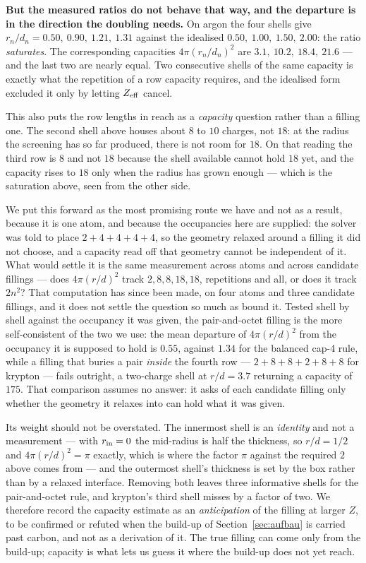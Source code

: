 \documentclass[11pt]{article}
\begin{document}
\textbf{But the measured ratios do not behave that way, and the departure is in the direction the
doubling needs.} On argon the four shells give $r_n/d_n = 0.50,\ 0.90,\ 1.21,\ 1.31$ against the
idealised $0.50,\ 1.00,\ 1.50,\ 2.00$: the ratio \emph{saturates}. The corresponding capacities
$4\pi(r_n/d_n)^2$ are $3.1,\ 10.2,\ 18.4,\ 21.6$ --- and the last two are nearly equal. Two
consecutive shells of the same capacity is exactly what the repetition of a row capacity requires,
and the idealised form excluded it only by letting $Z_{\rm eff}$ cancel.

This also puts the row lengths in reach as a \emph{capacity} question rather than a filling one. The
second shell above houses about $8$ to $10$ charges, not $18$: at the radius the screening has so far
produced, there is not room for $18$. On that reading the third row is $8$ and not $18$ because the
shell available cannot hold $18$ yet, and the capacity rises to $18$ only when the radius has grown
enough --- which is the saturation above, seen from the other side.

We put this forward as the most promising route we have and not as a result, because it is one atom,
and because the occupancies here are supplied: the solver was told to place $2{+}4{+}4{+}4{+}4$, so
the geometry relaxed around a filling it did not choose, and a capacity read off that geometry cannot
be independent of it. What would settle it is the same measurement across atoms and across candidate
fillings --- does $4\pi(r/d)^2$ track $2,8,8,18,18$, repetitions and all, or does it track $2n^2$?
That computation has since been made, on four atoms and three candidate fillings, and it does not
settle the question so much as bound it. Tested shell by shell against the occupancy it was given,
the pair-and-octet filling is the more self-consistent of the two we use: the mean departure of
$4\pi(r/d)^2$ from the occupancy it is supposed to hold is $0.55$, against $1.34$ for the balanced
cap-4 rule, while a filling that buries a pair \emph{inside} the fourth row ---
$2{+}8{+}8{+}2{+}8{+}8$ for krypton --- fails outright, a two-charge shell at $r/d=3.7$ returning a
capacity of $175$. That comparison assumes no answer: it asks of each candidate filling only whether
the geometry it relaxes into can hold what it was given.

Its weight should not be overstated. The innermost shell is an \emph{identity} and not a
measurement --- with $r_{\rm in}=0$ the mid-radius is half the thickness, so $r/d=1/2$ and
$4\pi(r/d)^2=\pi$ exactly, which is where the factor $\pi$ against the required $2$ above comes from
--- and the outermost shell's thickness is set by the box rather than by a relaxed interface. Removing
both leaves three informative shells for the pair-and-octet rule, and krypton's third shell misses by
a factor of two. We therefore record the capacity estimate as an \emph{anticipation} of the filling at
larger $Z$, to be confirmed or refuted when the build-up of Section~\ref{sec:aufbau} is carried past
carbon, and not as a derivation of it. The true filling can come only from the build-up; capacity is
what lets us guess it where the build-up does not yet reach.
\end{document}
